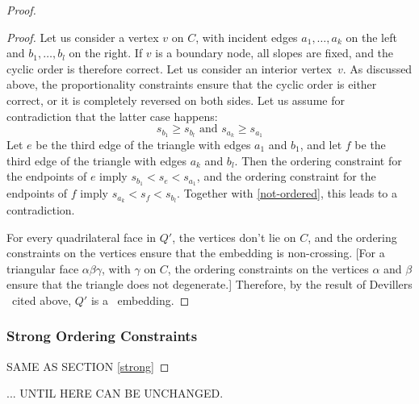 \begin{proof}
\begin{proof}
Let us consider a vertex $v$ on $C$, with
incident edges $a_1,\ldots,a_k$ 
on the left and $b_1,\ldots,b_l$ on the
right.
If $v$ is a boundary node, all slopes are fixed, and the cyclic order
is therefore correct.
Let us consider an interior vertex~$v$.
%
 As discussed above, the proportionality constraints ensure that
the cyclic order is either correct, or it is completely reversed on both
sides.
Let us assume for contradiction that the latter case happens:
\begin{equation}
  \label{eq:not-ordered}
s_{b_1}\ge s_{b_l}
\text{ and }
s_{a_k}\ge s_{a_1}
\end{equation}
Let $e$ be the third edge of the triangle with edges $a_1$ and $b_1$,
and let 
 $f$ be the third edge of the triangle with edges $a_k$ and $b_l$.
Then the ordering constraint for the endpoints of $e$ imply
\begin{math}
  s_{b_1}<s_e<s_{a_1}
\end{math},
and the ordering constraint for the endpoints of $f$ imply
\begin{math}
  s_{a_k}<s_f<s_{b_l}
\end{math}.
Together with \eqref{not-ordered}, this leads to a contradiction.

   For every quadrilateral face in $Q'$, the vertices don't lie on
   $C$, and the ordering constraints on the vertices
   ensure that the embedding is non-crossing.
[For a triangular face $\alpha\beta\gamma$, with $\gamma$ on
$C$,
 the ordering constraints on the vertices $\alpha$ and $\beta$
   ensure that the triangle does not degenerate.]
   Therefore, by the result
of Devillers \etal\
   cited above, $Q'$ is a \Fary\ embedding. %
\end{proof}


\subsubsection{Strong Ordering Constraints}
SAME AS SECTION \ref{strong}

\end{proof}

... UNTIL HERE CAN BE UNCHANGED.

